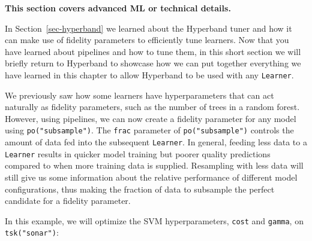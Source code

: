 \begin{tcolorbox}[enhanced jigsaw, colframe=quarto-callout-note-color-frame, rightrule=.15mm, bottomrule=.15mm, toprule=.15mm, opacityback=0, colback=white, left=2mm, arc=.35mm, breakable, leftrule=.75mm]
\begin{minipage}[t]{5.5mm}
\textcolor{quarto-callout-note-color}{\faInfo}
\end{minipage}%
\begin{minipage}[t]{\textwidth - 5.5mm}

\textbf{This section covers advanced ML or technical
details.}\vspace{2mm}

\end{minipage}%
\end{tcolorbox}

In Section~\ref{sec-hyperband} we learned about the
Hyperband tuner and how it can make use of fidelity
parameters to efficiently tune learners. Now
that you have learned about pipelines and how to tune them, in this
short section we will briefly return to Hyperband to showcase how we can
put together everything we have learned in this chapter to allow
Hyperband to be used with any \texttt{Learner}.

We previously saw how some learners have hyperparameters that can act
naturally as fidelity parameters, such as the number of trees in a
random forest. However, using pipelines, we can now create a fidelity
parameter for any model using \texttt{po("subsample")}. The
\texttt{frac} parameter of \texttt{po("subsample")} controls the amount
of data fed into the subsequent \texttt{Learner}. In general, feeding
less data to a \texttt{Learner} results in quicker model training but
poorer quality predictions compared to when more training data is
supplied. Resampling with less data will still give us some information
about the relative performance of different model configurations, thus
making the fraction of data to subsample the perfect candidate for a
fidelity parameter.

In this example, we will optimize the SVM
hyperparameters, \texttt{cost} and \texttt{gamma}, on
\texttt{tsk("sonar")}:

\begin{Shaded}
\begin{Highlighting}[]

\OtherTok{=} \NormalTok{(}\NormalTok{, } \NormalTok{, } \NormalTok{,}
   \NormalTok{, } \NormalTok{(}\NormalTok{, }\NormalTok{, } \NormalTok{),}
   \NormalTok{(}\NormalTok{, }\NormalTok{, } \NormalTok{))}
\end{Highlighting}
\end{Shaded}

